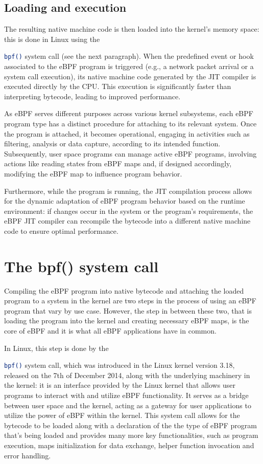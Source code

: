 \subsection{Loading and execution}

The resulting native machine code is then loaded into the kernel's memory space: this is done in Linux using the \raggedright\colorbox{backcolour}{\lstinline[style=commandline, language=bash]|bpf()|} system call (see the next paragraph).
When the predefined event or hook associated to the eBPF program is triggered (e.g., a network packet arrival or a system call execution), its native machine code generated by the JIT compiler is executed directly by the CPU. 
This execution is significantly faster than interpreting bytecode, leading to improved performance.

As eBPF serves different purposes across various kernel subsystems, each eBPF program type has a distinct procedure for attaching to its relevant system. 
Once the program is attached, it becomes operational, engaging in activities such as filtering, analysis or data capture, according to its intended function. 
Subsequently, user space programs can manage active eBPF programs, involving actions like reading states from eBPF maps and, if designed accordingly, modifying the eBPF map to influence program behavior.

Furthermore, while the program is running, the JIT compilation process allows for the dynamic adaptation of eBPF program behavior based on the runtime environment: if changes occur in the system or the program's requirements, the eBPF JIT compiler can recompile the bytecode into a different native machine code to ensure optimal performance.

\section{The bpf() system call}

Compiling the eBPF program into native bytecode and attaching the loaded program to a system in the kernel are two steps in the process of using an eBPF program that vary by use case.
However, the step in between these two, that is loading the program into the kernel and creating necessary eBPF maps, is the core of eBPF and it is what all eBPF applications have in common.

In Linux, this step is done by the \raggedright\colorbox{backcolour}{\lstinline[style=commandline, language=bash]|bpf()|} system call, which was introduced in the Linux kernel version 3.18, released on the 7th of December 2014, along with the underlying machinery in the kernel: it is an interface provided by the Linux kernel that allows user programs to interact with and utilize eBPF functionality. 
It serves as a bridge between user space and the kernel, acting as a gateway for user applications to utilize the power of eBPF within the kernel.
This system call allows for the bytecode to be loaded along with a declaration of the the type of eBPF program that’s being loaded and provides many more key functionalities, such as program execution, maps initialization for data exchange, helper function invocation and error handling.


